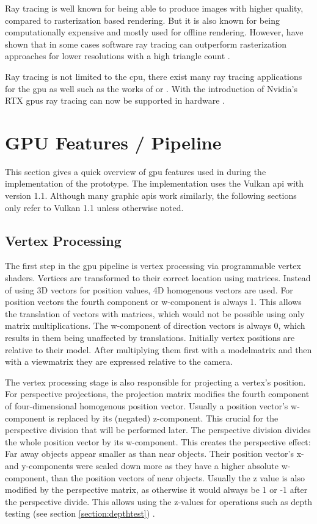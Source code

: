 Ray tracing is well known for being able to produce images with higher quality, compared to rasterization based rendering. But it is also known for being computationally expensive and mostly used for offline rendering. However, \textcite{wald:2001:interactive} have shown that in some cases software ray tracing can outperform rasterization approaches for lower resolutions with a high triangle count \cite{wald:2001:interactive}.

Ray tracing is not limited to the \gls{cpu}, there exist many ray tracing applications for the \gls{gpu} as well such as the works of \textcite{foley:2005:kd} or \textcite{parker:2010:optix}. With the introduction of Nvidia's RTX \glspl{gpu} ray tracing can now be supported in hardware \cite{raytracinggems}.


\section{GPU Features / Pipeline}

This section gives a quick overview of \gls{gpu} features used in during the implementation of the prototype. The implementation uses the Vulkan \gls{api} with version 1.1. Although many graphic \glspl{api} work similarly, the following sections only refer to Vulkan 1.1 unless otherwise noted.


\subsection{Vertex Processing}
The first step in the \gls{gpu} pipeline is vertex processing via programmable vertex shaders. Vertices are transformed to their correct location using matrices. Instead of using 3D vectors for position values, 4D homogenous vectors are used. For position vectors the fourth component or w-component is always 1. This allows the translation of vectors with matrices, which would not be possible using only matrix multiplications. The w-component of direction vectors is always 0, which results in them being unaffected by translations. Initially vertex positions are relative to their model. After multiplying them first with a \gls{modelmatrix} and then with a \gls{viewmatrix} they are expressed relative to the camera.

The vertex processing stage is also responsible for projecting a vertex's position. For perspective projections, the projection matrix modifies the fourth component of four-dimensional homogenous position vector. Usually a position vector's w-component is replaced by its (negated) z-component. This crucial for the perspective division that will be performed later. The perspective division divides the whole position vector by its w-component. This creates the perspective effect: Far away objects appear smaller as than near objects. Their position vector's x- and y-components were scaled down more as they have a higher absolute w-component, than the position vectors of near objects. Usually the z value is also modified by the perspective matrix, as otherwise it would always be 1 or -1 after the perspective divide. This allows using the z-values for operations such as depth testing (see section \ref{section:depthtest}) \cite{akine:2018:realtime}.

